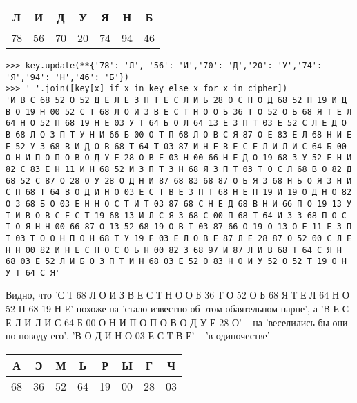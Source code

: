 \documentclass[letterpaper,11pt,openany]{book}
\begin{document}
{\centering
\begin{tabular}{||c|c|c|c|c|c|c||}
\hline
\textbf{Л} & \textbf{И} & \textbf{Д} & \textbf{У} & \textbf{Я} & \textbf{Н} & \textbf{Б} \\
\hline
78 & 56 & 70 & 20 & 74 & 94 & 46  \\
\hline
\end{tabular}

}

\medskip

\begin{lstlisting}
>>> key.update(**{'78': 'Л', '56': 'И','70': 'Д','20': 'У','74': 'Я','94': 'Н','46': 'Б'})
>>> ' '.join([key[x] if x in key else x for x in cipher])
'И В С 68 52 О 52 Д Е Л Е З П Т Е С Л И Б 28 О С П О Д 68 52 П 19 И Д В О 19 Н 00 52 С Т 68 Л О И З В Е С Т Н О О Б 36 Т О 52 О Б 68 Я Т Е Л 64 Н О 52 П 68 19 Н Е 03 У Т 64 Б О Л 64 13 Е З П Т 03 Е 52 С Л Е Д О В 68 Л О З П Т У Н И 66 Б 00 О Т П 68 Л О В С Я 87 О Е 83 Е Л 68 Н И Е Е 52 У З 68 В И Д О В 68 Т 64 Т 03 87 И Н Е В Е С Е Л И Л И С 64 Б 00 О Н И П О П О В О Д У Е 28 О В Е 03 Н 00 66 Н Е Д О 19 68 З У 52 Е Н И 82 С 83 Е Н 11 И Н 68 52 И З П Т З Н 68 Я З П Т 03 Т О С Л 68 В О 82 Д 68 52 С 87 О 28 О У 28 О Д Н И 87 68 83 68 87 О Б Я З 68 Н Б О Я З Н И С П 68 Т 64 В О Д И Н О 03 Е С Т В Е З П Т 68 Н Е П 19 И 19 О Д Н О 82 О З 68 Б О 03 Е Н Н О С Т И Т 03 87 68 С Н Е Д 68 В Н И 66 П О 19 13 У Т И В О В С Е С Т 19 68 13 И Л С Я З 68 С 00 П 68 Т 64 И З З 68 П О С Т О Я Н Н 00 66 87 О 13 52 68 19 О В Т 03 87 66 О 19 О 13 О Е 11 Е З П Т 03 Т О О Н П О Н 68 Т У 19 Е 03 Е Л О В Е 87 Л Е 28 87 О 52 00 С Л Е Н Н 00 82 И Н Е С П О С О Б Н 00 82 З 68 97 И 87 Л И В 68 Т 64 С Я Н 68 03 Е 52 Л И Б О З П Т И Н 68 03 Е 52 О 83 Н О И У 52 О 52 Т 19 О Н У Т 64 С Я'
\end{lstlisting}

Видно, что 'С Т 68 Л О И З В Е С Т Н О О Б 36 Т О 52 О Б 68 Я Т Е Л 64 Н О 52 П 68 19 Н Е' похоже на 'стало известно об этом обаятельном парне', а 'В Е С Е Л И Л И С 64 Б 00 О Н И П О П О В О Д У Е 28 О' -- на 'веселились бы они по поводу его', 'В О Д И Н О 03 Е С Т В Е' -- 'в одиночестве'

\medskip

{\centering
\begin{tabular}{||c|c|c|c|c|c|c|c||}
\hline
\textbf{А} & \textbf{Э} & \textbf{М} & \textbf{Ь} & \textbf{Р} & \textbf{Ы} & \textbf{Г} & \textbf{Ч} \\
\hline
68 & 36 & 52 & 64 & 19 & 00 & 28 & 03 \\
\hline
\end{tabular}

}
\medskip
\end{document}
